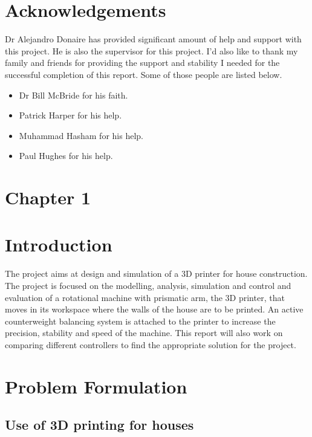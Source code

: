 \documentclass{UoNMCHA}
\numberwithin{equation}{section}
\begin{document}
	\section*{Acknowledgements}
	
	Dr Alejandro Donaire has provided significant amount of help and support with this project. He is also the supervisor for this project. I'd also like to thank my family and friends for providing the support and stability I needed for the successful completion of this report. Some of those people are listed below.
	\begin{itemize}
		\item Dr Bill McBride for his faith.
		\item Patrick Harper for his help.
		\item Muhammad Hasham for his help.
		\item Paul Hughes for his help.
		
	\end{itemize}
	
	\newpage
	\tableofcontents
	\listoffigures
	\listoftables
	\newpage
	\section*{Chapter 1}
	\section{Introduction}
	
	The project aims at design and simulation of a 3D printer for house construction. The project is focused on the modelling, analysis, simulation and control and evaluation of a rotational machine with prismatic arm, the 3D printer, that moves in its workspace where the walls of the house are to be printed. An active counterweight balancing system is attached to the printer to increase the precision, stability and speed of the machine. This report will also work on comparing different controllers to find the appropriate solution for the project.
	
	
	\newpage
	\section{Problem Formulation}\label{Problem Formulation}
	
	\subsection{Use of 3D printing for houses}\label{Use of 3D printing for houses}
	
\end{document}
